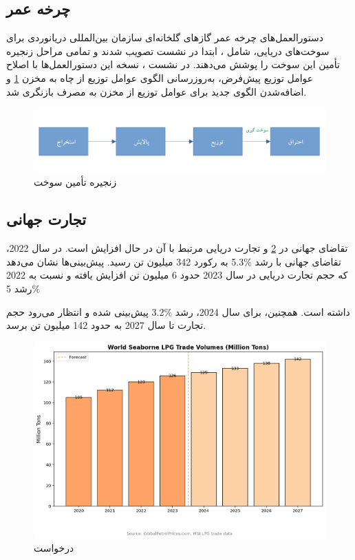 \subsection{چرخه عمر}
دستورالعمل‌های چرخه عمر گازهای گلخانه‌ای 
 سازمان بین‌المللی دریانوردی  برای سوخت‌های دریایی، شامل 
 ، ابتدا در نشست 
 تصویب شدند و تمامی مراحل زنجیره تأمین این سوخت را پوشش می‌دهند. در نشست
  ،
   نسخه
    این دستورالعمل‌ها 
    با اصلاح عوامل توزیع پیش‌فرض، به‌روزرسانی الگوی عوامل توزیع از چاه به مخزن
    \cref{Suplly-Chain}
     و اضافه‌شدن الگوی جدید برای عوامل توزیع از مخزن به مصرف 
      بازنگری شد.
 \cite{Comparative-Life-Cycle}
 \begin{figure}[!h]
 	\centering
 	\includegraphics[width=15cm]{Figures/LPG/supply-chain.png}
 	\caption{ زنجیره تأمین سوخت}\label{Suplly-Chain}
 \end{figure}
 
\subsection{تجارت جهانی}
 تقاضای جهانی  
 در
  \cref{future}
 و تجارت دریایی مرتبط با آن در حال افزایش است. در سال 2022،
  تقاضای جهانی
    با رشد 
    $\%$5.3
    به رکورد 342 میلیون تن رسید. پیش‌بینی‌ها نشان می‌دهد که حجم تجارت دریایی
     در سال 2023 حدود 6 میلیون تن افزایش یافته و نسبت به 2022 رشد 5$\%$
   
      داشته است. همچنین، برای سال 2024، رشد
      $\%$3.2
        پیش‌بینی شده و انتظار می‌رود حجم تجارت تا سال 2027 به حدود 142 میلیون تن برسد.
 \begin{figure}[!h]
	\centering
	\includegraphics[width=15cm]{Figures/LPG/future.png}
	\caption{ درخواست }\label{future}
\end{figure} 
 
